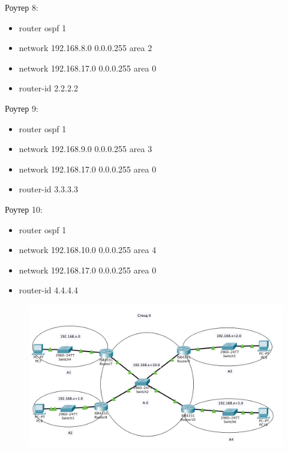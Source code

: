 \documentclass[a4paper,12pt]{article}
\begin{document}
	Роутер 8:
	
	\begin{itemize}
		\item router ospf 1
		\item network 192.168.8.0 0.0.0.255 area 2
		\item network 192.168.17.0 0.0.0.255 area 0
		\item router-id 2.2.2.2
	\end{itemize}

	Роутер 9:
	
	\begin{itemize}
		\item router ospf 1
		\item network 192.168.9.0 0.0.0.255 area 3
		\item network 192.168.17.0 0.0.0.255 area 0
		\item router-id 3.3.3.3
	\end{itemize}

	Роутер 10:
	
	\begin{itemize}
		\item router ospf 1
		\item network 192.168.10.0 0.0.0.255 area 4
		\item network 192.168.17.0 0.0.0.255 area 0
		\item router-id 4.4.4.4
	\end{itemize}

	\begin{figure}[h!]
		\begin{center}
			{\includegraphics[width = \textwidth]{img/5.png}}
			\caption{}
			\label{ris:5}
		\end{center}
	\end{figure}

	\newpage
\end{document}
